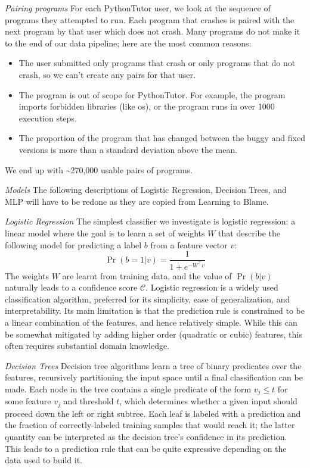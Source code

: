 \documentclass[conference]{IEEEtran}
\begin{document}
\emph{Pairing programs} For each PythonTutor user, we look at the sequence of
programs they attempted to run. Each program that crashes is paired with the next
program by that user which does not crash. Many programs do not make it to the
end of our data pipeline; here are the most common reasons:
\begin{itemize}
    \item The user submitted only programs that crash or only programs that do
    not crash, so we can't create any pairs for that user.
    \item The program is out of scope for PythonTutor. For
    example, the program imports forbidden libraries (like os), or the program
    runs in over 1000 execution steps.
    \item The proportion of the program that has changed between the buggy and
    fixed versions is more than a standard deviation above the mean.
\end{itemize}
We end up with \textasciitilde270,000 usable pairs of programs.

\emph{Models} The following descriptions of Logistic Regression, Decision Trees,
and MLP will have to be redone as they are copied from Learning to Blame.

\emph{Logistic Regression}
The simplest classifier we investigate is logistic regression:
a linear model where the goal is to learn a set of weights $W$
that describe the following model for predicting a label
$b$ from a feature vector $v$:
%
\[ \Pr(b = 1 | v) = \frac{1}{1 + e^{-W^{\top} v}} \]
%
The weights $W$ are learnt from training data, and the value of
$\Pr(b | v)$ naturally leads to a confidence score $\mathcal{C}$.
%
Logistic regression is a widely used classification algorithm, preferred
for its simplicity, ease of generalization, and interpretability.
%
Its main limitation is that the prediction rule is constrained to be a
linear combination of the features, and hence relatively simple.
%
While this can be somewhat mitigated by adding higher order (quadratic
or cubic) features, this often requires substantial domain knowledge.

\emph{Decision Trees}
Decision tree algorithms learn a tree of binary predicates over the
features, recursively partitioning the input space until a final
classification can be made.
%
Each node in the tree contains a single predicate of the form
$v_j \leq t$ for some feature $v_j$ and threshold $t$, which determines
whether a given input should proceed down the left or right subtree.
%
Each leaf is labeled with a prediction and the fraction of
correctly-labeled training samples that would reach it; the latter
quantity can be interpreted as the decision tree's confidence in its
prediction.
%
This leads to a prediction rule that can be quite expressive depending
on the data used to build it.
\end{document}
